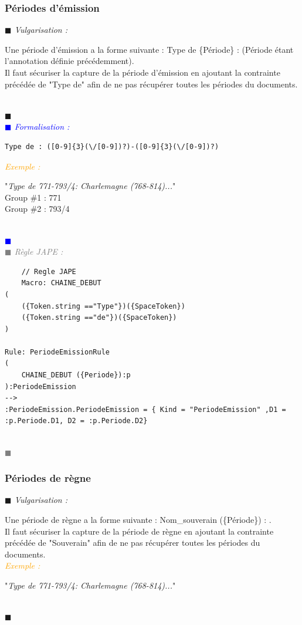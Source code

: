 \documentclass[a4paper, 11pt]{report}
\newenvironment{vulgarisation}
    {
    \textit{\textcolor{dark-blue}{$\blacksquare$  Vulgarisation : \\}}

    }
    {
    ~\\\textcolor{dark-blue}{$\blacksquare$}\\
    }
\newenvironment{formalisation}
    {
    \textit{\textcolor{blue}{$\blacksquare$  Formalisation : \\}}
    }
    {
    ~\\\textcolor{blue}{$\blacksquare$}\\
    }
\newenvironment{codage}
    {
    \textit{\textcolor{gray}{$\blacksquare$  Règle JAPE : \\}}
    }
    {
    ~\\\textcolor{gray}{$\blacksquare$}\\
    }
\newenvironment{exemple}
    {
    \textit{\textcolor{orange}{
    Exemple : \\}}
    }
    {~\\
    }
\begin{document}
\newpage
\subsubsection{Périodes d'émission}
\begin{vulgarisation}
	Une période d'émission a la forme suivante :  \og Type de \{Période\} : \fg{} (Période étant l'annotation définie précédemment).\\
	Il faut sécuriser la capture de la période d'émission en ajoutant la contrainte précédée de "Type de" afin de ne pas récupérer toutes les périodes du documents.
\end{vulgarisation}
\begin{formalisation}
	\begin{verbatim}
Type de : ([0-9]{3}(\/[0-9])?)-([0-9]{3}(\/[0-9])?)
	\end{verbatim}
	\begin{exemple}
		"\emph{Type de 771-793/4: Charlemagne (768-814)...}" \\
		Group \#1 : 771 \\
		Group \#2 : 793/4
	\end{exemple}

\end{formalisation}
			\begin{codage}
	\begin{lstlisting}
	// Regle JAPE
	Macro: CHAINE_DEBUT
(
    ({Token.string =="Type"})({SpaceToken})
    ({Token.string =="de"})({SpaceToken})
)

Rule: PeriodeEmissionRule
(
    CHAINE_DEBUT ({Periode}):p
):PeriodeEmission
-->
:PeriodeEmission.PeriodeEmission = { Kind = "PeriodeEmission" ,D1 = :p.Periode.D1, D2 = :p.Periode.D2}
	\end{lstlisting}
	\end{codage}

\subsubsection{Périodes de règne}
\begin{vulgarisation}
	Une période de règne a la forme suivante : \og Nom\_souverain (\{Période\}) : \fg{}.\\
	Il faut sécuriser la capture de la période de règne en ajoutant la contrainte précédée de "Souverain" afin de ne pas récupérer toutes les périodes du documents.\\
	\begin{exemple}
		"\emph{Type de 771-793/4: Charlemagne (768-814)...}" 
	\end{exemple}
\end{vulgarisation}
\end{document}
